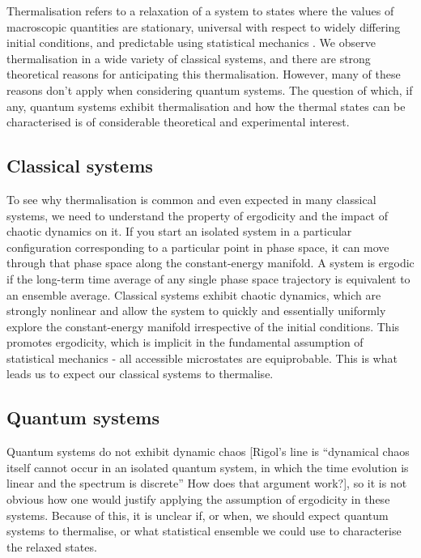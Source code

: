 \documentclass[a4paper,10pt]{article}
\begin{document}
Thermalisation refers to a relaxation of a system to states where the values of macroscopic quantities are stationary, universal with respect to 
widely differing initial conditions, and predictable using statistical mechanics \cite{Rigol2008}. We observe thermalisation in a wide variety of classical systems, and there 
are strong theoretical reasons for anticipating this thermalisation. However, many of these reasons don't apply when considering quantum systems. The question of 
which, if any, quantum systems exhibit thermalisation and how the thermal states can be characterised is of considerable theoretical and experimental interest. 

 \subsection{Classical systems}
To see why thermalisation is common and even expected in many classical systems, we need to understand the property of ergodicity and the impact of chaotic dynamics on it. 
If you start an isolated system in a particular configuration corresponding to a particular point in phase space, it can move through that phase space along the constant-energy
manifold. A system is ergodic if the long-term time average of any single phase space trajectory is equivalent to an ensemble average.  
Classical systems  exhibit chaotic dynamics, which are strongly nonlinear and allow the system to quickly 
and essentially uniformly explore the constant-energy manifold irrespective of the initial conditions. This promotes ergodicity, which is implicit in the fundamental assumption of 
statistical mechanics - all accessible microstates are equiprobable.  This is what leads us to expect our classical systems to thermalise.

 \subsection{Quantum systems}
Quantum systems do not  exhibit dynamic chaos  [Rigol's line is ``dynamical chaos itself cannot occur in an isolated quantum system, in which the time 
evolution is linear and the spectrum is discrete'' How does that argument work?], so it is not obvious how one would justify applying the assumption of ergodicity in these systems. Because of 
this, it is unclear if, or when, we should expect quantum systems to thermalise, or what statistical ensemble we could use to characterise the relaxed states. 
\end{document}
